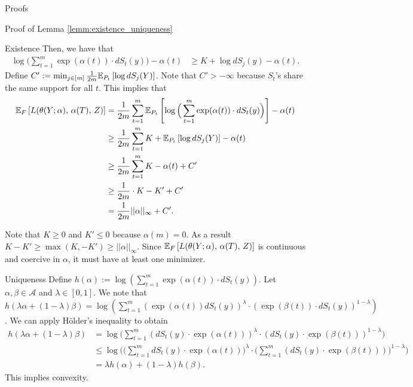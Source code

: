 \documentclass{article}
\theoremstyle{definition}
\theoremstyle{plain}
\theoremstyle{remark}
\begin{document}
\begin{section}{Proofs}
\begin{subsection}{Proof of Lemma \ref{lemm:existence_uniqueness}}
\begin{subsubsection}{Existence}
Then, we have that 
\begin{align*}
\log\Big(\sum_{t=1}^{m} \exp(\alpha(t)) \cdot dS_{t}(y)\Big) - \alpha(t) &\geq  K + \log dS_{j}(y) - \alpha(t).
\end{align*}
Define $C' := \min_{j \in [m]} \frac{1}{2m} \EE[P_{t}]{\log dS_{j}(Y)}$. Note that $C' > - \infty$ because $S_{t}$'s share the same support for all $t$. This implies that
\begin{align*}
\EE[F]{L(\theta(Y; \alpha),\, \alpha(T),\, Z)} &= \frac{1}{2m} \sum_{t=1}^{m} \EE[P_{t}]{\log\Big(\sum_{t=1}^{m} \exp(\alpha(t)) \cdot dS_{t}(y)\Big)} - \alpha(t) \\
&\geq  \frac{1}{2m} \sum_{t=1}^{m} K + \EE[P_{t}]{\log dS_{j}(Y)} - \alpha(t) \\
&\geq \frac{1}{2m} \sum_{t=1}^{m} K - \alpha(t) + C'  \\
&\geq \frac{1}{2m} \cdot K - K'  + C' \\
&= \frac{1}{2m} ||\alpha||_{\infty} + C'.
\end{align*}

Note that $K \geq 0$ and $K' \leq 0$ because $\alpha(m) = 0$. As a result $K - K' \geq \max(K, - K') \geq ||\alpha||_{\infty}.$ Since $\EE[F]{L(\theta(Y; \alpha),\, \alpha(T),\, Z)}$ is continuous and coercive in $\alpha$, it must have at least one minimizer.


\end{subsubsection}

\begin{subsubsection}{Uniqueness}
Define $h(\alpha) := \log(\sum_{t=1}^{m} \exp(\alpha(t)) \cdot dS_{t}(y))$. Let $\alpha, \beta \in \mathcal{A}$ and $\lambda \in [0, 1]$. We note that $h(\lambda \alpha + (1 - \lambda)\beta) = \log(\sum_{t=1}^{m} (\exp(\alpha(t)) dS_{t}(y))^{\lambda} \cdot (\exp(\beta(t)) \cdot dS_{t}(y))^{1- \lambda})$. We can apply Hölder's inequality to obtain
\begin{align*}
h(\lambda \alpha + (1- \lambda) \beta) &= \log\Big(\sum_{t=1}^{m} (dS_{t}(y) \cdot \exp(\alpha(t)))^{\lambda} \cdot  (dS_{t}(y) \cdot \exp(\beta(t)))^{1 - \lambda} \Big) \\
&\leq \log\Bigg( \Big( \sum_{t=1}^{m} dS_{t}(y) \cdot \exp(\alpha(t)) \Big)^{\lambda} \cdot \Big(\sum_{t=1}^{m} (dS_{t}(y) \cdot \exp(\beta(t))) \Big)^{1 - \lambda} \Bigg) \\
&=  \lambda h(\alpha) + (1 - \lambda) h(\beta).
\end{align*}
This implies convexity. 


\end{subsubsection}
\end{subsection}
\end{section}
\end{document}
